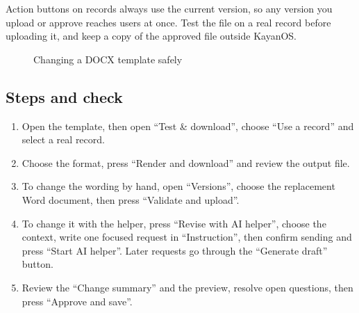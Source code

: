 \begin{rcwarn}
Action buttons on records always use the current version, so any version you upload or approve reaches users at once. Test the file on a real record before uploading it, and keep a copy of the approved file outside KayanOS.
\end{rcwarn}

\begin{figure}[H]
\centering
{}
\rclegend
\caption{Changing a DOCX template safely}
\label{fig:builder-docx-workspace-flow}
\end{figure}

\subsection{Steps and check}
\begin{enumerate}
\item Open the template, then open “Test \& download”, choose “Use a record” and select a real record.
\item Choose the format, press “Render and download” and review the output file.
\item To change the wording by hand, open “Versions”, choose the replacement Word document, then press “Validate and upload”.
\item To change it with the helper, press “Revise with AI helper”, choose the context, write one focused request in “Instruction”, then confirm sending and press “Start AI helper”. Later requests go through the “Generate draft” button.
\item Review the “Change summary” and the preview, resolve open questions, then press “Approve and save”.
\end{enumerate}

